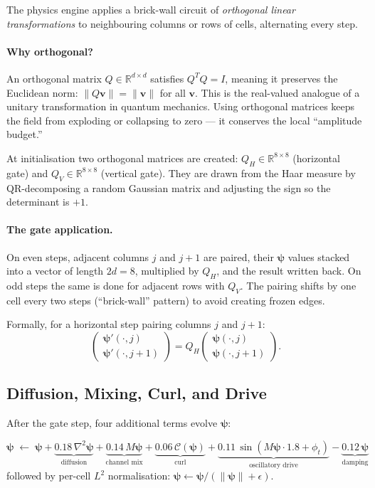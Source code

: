 \documentclass[12pt,a4paper]{article}
\newcommand{\bpsi}{\boldsymbol{\psi}}
\newcommand{\RR}{\mathbb{R}}
\newcommand{\vv}[1]{\mathbf{#1}}
\begin{document}
The physics engine applies a brick-wall circuit of \emph{orthogonal
linear transformations} to neighbouring columns or rows of cells,
alternating every step.

\paragraph{Why orthogonal?}
An orthogonal matrix $Q \in \RR^{d\times d}$ satisfies
$Q^T Q = I$, meaning it preserves the Euclidean norm:
$\|Q\vv{v}\| = \|\vv{v}\|$ for all $\vv{v}$.
This is the real-valued analogue of a unitary transformation in
quantum mechanics.
Using orthogonal matrices keeps the field from exploding
or collapsing to zero — it conserves the local ``amplitude budget.''

At initialisation two orthogonal matrices are created:
$Q_H \in \RR^{8\times 8}$ (horizontal gate) and
$Q_V \in \RR^{8\times 8}$ (vertical gate).
They are drawn from the Haar measure by QR-decomposing
a random Gaussian matrix and adjusting the sign so the determinant
is $+1$.

\paragraph{The gate application.}
On even steps, adjacent columns $j$ and $j+1$ are paired,
their $\bpsi$ values stacked into a vector
of length $2d = 8$, multiplied by $Q_H$, and the result written back.
On odd steps the same is done for adjacent rows with $Q_V$.
The pairing shifts by one cell every two steps
(``brick-wall'' pattern) to avoid creating frozen edges.

Formally, for a horizontal step pairing columns $j$ and $j+1$:
\[
  \begin{pmatrix} \bpsi'(\cdot,j) \\
    \bpsi'(\cdot,j+1) \end{pmatrix}
  = Q_H
  \begin{pmatrix} \bpsi(\cdot,j) \\
    \bpsi(\cdot,j+1) \end{pmatrix}.
\]

\subsection{Diffusion, Mixing, Curl, and Drive}

After the gate step, four additional terms evolve $\bpsi$:

\begin{tcolorbox}[mathbox={The full psi update}]
\begin{equation}
  \bpsi \;\leftarrow\;
  \bpsi
  + \underbrace{0.18\,\nabla^2\bpsi}_{\text{diffusion}}
  + \underbrace{0.14\, M\bpsi}_{\text{channel mix}}
  + \underbrace{0.06\,\mathcal{C}(\bpsi)}_{\text{curl}}
  + \underbrace{0.11\,\sin(M\bpsi \cdot 1.8 + \phi_t)}_{\text{oscillatory drive}}
  - \underbrace{0.12\,\bpsi}_{\text{damping}}
  \label{eq:psi}
\end{equation}
followed by per-cell $L^2$ normalisation:
$\bpsi \leftarrow \bpsi / (\|\bpsi\| + \epsilon)$.
\end{tcolorbox}
\end{document}
